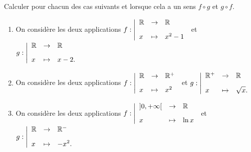 \documentclass[a4paper, 11pt]{article}
\begin{document}
\begin{exemples}
	Calculer pour chacun des cas suivants et lorsque cela a un sens $f\circ g$ et $g\circ f$.
	\begin{enumerate}
		\item On consid\`ere les deux applications $f:
			      \left|\begin{array}{lll}
				      \R & \rightarrow & \R\vsec \\
				      x  & \mapsto     & x^2-1
			      \end{array} \right. $ et $g:
			      \left|\begin{array}{lll}
				      \R & \rightarrow & \R\vsec   \\
				      x  & \mapsto     & \ddp x-2.
			      \end{array} \right.$

		\item On consid\`ere les deux applications $f:
			      \left|\begin{array}{lll}
				      \R & \rightarrow & \R^{+}\vsec \\
				      x  & \mapsto     & x^2
			      \end{array} \right. $ et $g:
			      \left|\begin{array}{lll}
				      \R^+ & \rightarrow & \R\vsec        \\
				      x    & \mapsto     & \ddp \sqrt{x}.
			      \end{array}\right.$

		\item On consid\`ere les deux applications $f:
			      \left|\begin{array}{lll}
				      ]0,+\infty[ & \rightarrow & \R\vsec \\
				      x           & \mapsto     & \ln x
			      \end{array} \right. $ et $g:
			      \left|\begin{array}{lll}
				      \R & \rightarrow & \R^{-}\vsec \\
				      x  & \mapsto     & \ddp -x^2.
			      \end{array} \right.$

	\end{enumerate}
\end{exemples}
\end{document}
